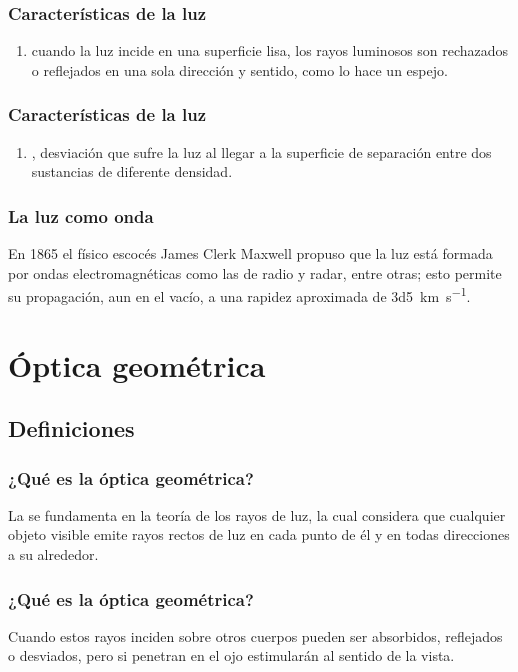\documentclass[14pt]{beamer}
\begin{document}
\begin{frame}
\frametitle{Características de la luz}
\begin{enumerate}[<+->]
\conti
\item {} \pause cuando la luz incide en una superficie lisa, los rayos luminosos son rechazados o reflejados en una sola dirección y sentido, como lo hace un espejo.
\seti
\end{enumerate}
\end{frame}
\begin{frame}
\frametitle{Características de la luz}
\begin{enumerate}[<+->]
\conti
\item {}, \pause desviación que sufre la luz al llegar a la superficie de separación entre dos sustancias de diferente densidad.
\end{enumerate}
\end{frame}
\begin{frame}
\frametitle{La luz como onda}
En 1865 el físico escocés James Clerk Maxwell propuso que la luz está formada por ondas electromagnéticas
como las de radio y radar, entre otras; \pause esto permite su propagación, aun en el vacío, a una rapidez aproximada de \SI{3d5}{\kilo\meter\per\second}.
\end{frame}


\section{Óptica geométrica}
\subsection{Definiciones}

\begin{frame}
\frametitle{¿Qué es la óptica geométrica?}
La  se fundamenta en la teoría de los rayos de luz, \pause la cual considera que cualquier objeto visible emite rayos rectos de luz en cada punto de él y en todas direcciones a su alrededor.
\end{frame}
\begin{frame}
\frametitle{¿Qué es la óptica geométrica?}
Cuando estos rayos inciden sobre otros cuerpos pueden ser absorbidos, \pause reflejados o desviados, \pause 
pero si penetran en el ojo estimularán al sentido de la vista.
\end{frame}
\end{document}

